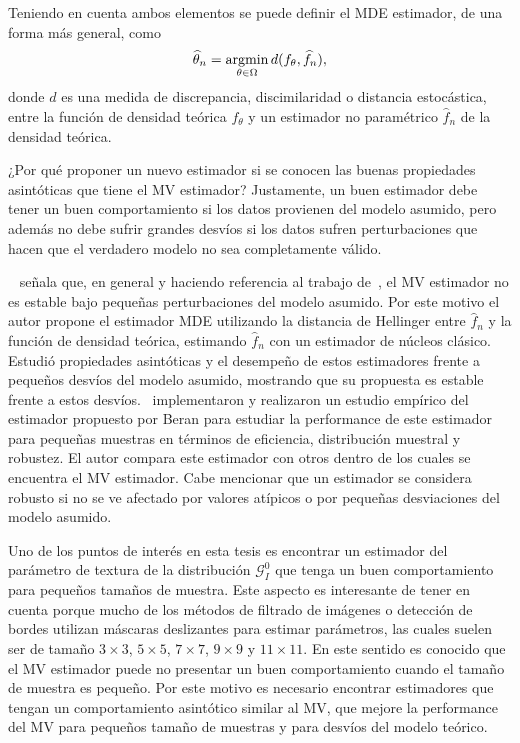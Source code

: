 %

Teniendo en cuenta ambos elementos se puede definir el MDE estimador, de una forma más general, como 
\begin{align}
\widehat{\theta}_n=\mathop{\rm argmin} \limits_{\theta\in\Omega} d(f_{\theta}, \widehat{f}_n),
\end{align}
donde $d$ es una medida de discrepancia, discimilaridad o distancia estocástica, entre la función de densidad teórica $f_{\theta}$ y un estimador no paramétrico $\widehat{f}_n$ de la densidad teórica.

¿Por qué proponer un nuevo estimador si se conocen las buenas propiedades asintóticas que tiene el MV estimador? Justamente, un buen estimador debe tener un buen comportamiento si los datos provienen del modelo asumido, pero además no debe sufrir grandes desvíos si los datos sufren perturbaciones que hacen que el verdadero modelo no sea completamente válido. 

~\citet{beran1977} señala que, en general y haciendo referencia al trabajo de~\citet{Huber1972}, el MV estimador no es estable bajo pequeñas perturbaciones del modelo asumido. Por este motivo el autor propone el estimador MDE utilizando la distancia de Hellinger entre $\widehat{f}_n$ y la función de densidad teórica, estimando $\widehat{f}_n$ con un estimador de núcleos clásico. Estudió propiedades asintóticas y el desempeño de estos estimadores frente a pequeños desvíos del modelo asumido, mostrando que su propuesta es estable frente a estos desvíos.~\citet{Eslinger1990} implementaron y realizaron un estudio empírico del estimador propuesto por Beran para estudiar la performance de este estimador para pequeñas muestras en términos de eficiencia, distribución muestral y robustez. El autor compara este estimador con otros dentro de los cuales se encuentra el MV estimador. Cabe mencionar que un estimador se considera robusto si no se ve afectado por valores atípicos o por pequeñas desviaciones del modelo asumido. 

Uno de los puntos de interés en esta tesis es encontrar un estimador del parámetro de  textura de la distribución $\mathcal{G}_I^{0}$ que tenga un buen comportamiento para pequeños tamaños de muestra. Este aspecto es interesante de tener en cuenta porque mucho de los métodos de filtrado de imágenes o detección de bordes utilizan máscaras deslizantes para estimar parámetros, las cuales suelen ser de tamaño $3 \times 3$, $5 \times 5$, $7 \times 7$, $9 \times 9$ y $11 \times 11$. En este sentido es conocido que el MV estimador puede no presentar un buen comportamiento cuando el tamaño de muestra es pequeño. Por este motivo es necesario encontrar estimadores que tengan un comportamiento asintótico similar al MV, que mejore la performance del MV para pequeños tamaño de muestras y para desvíos del modelo teórico.

